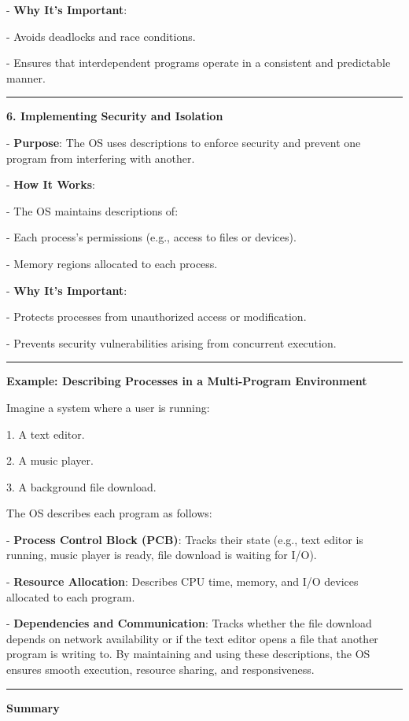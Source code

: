 \documentclass[a4paper]{book}
\begin{document}
   - \textbf{Why It's Important}:
     
     - Avoids deadlocks and race conditions.
     
     - Ensures that interdependent programs operate in a consistent and predictable manner.

\rule{0.75\textwidth}{0.5pt}

\textbf{6. Implementing Security and Isolation}

   - \textbf{Purpose}: The OS uses descriptions to enforce security and prevent one program from interfering with another.
   
   - \textbf{How It Works}:
   
     - The OS maintains descriptions of:
       
       - Each process's permissions (e.g., access to files or devices).
       
       - Memory regions allocated to each process.
   
   - \textbf{Why It's Important}:
     
     - Protects processes from unauthorized access or modification.
     
     - Prevents security vulnerabilities arising from concurrent execution.
     
\rule{0.75\textwidth}{0.5pt}

\textbf{Example: Describing Processes in a Multi-Program Environment}

Imagine a system where a user is running:

1. A text editor.

2. A music player.

3. A background file download.

The OS describes each program as follows:

- \textbf{Process Control Block (PCB)}: Tracks their state (e.g., text editor is running, music player is ready, file download is waiting for I/O).

- \textbf{Resource Allocation}: Describes CPU time, memory, and I/O devices allocated to each program.

- \textbf{Dependencies and Communication}: Tracks whether the file download depends on network availability or if the text editor opens a file that another program is writing to.
By maintaining and using these descriptions, the OS ensures smooth execution, resource sharing, and responsiveness.

\rule{0.75\textwidth}{0.5pt}

\textbf{Summary}
\end{document}
